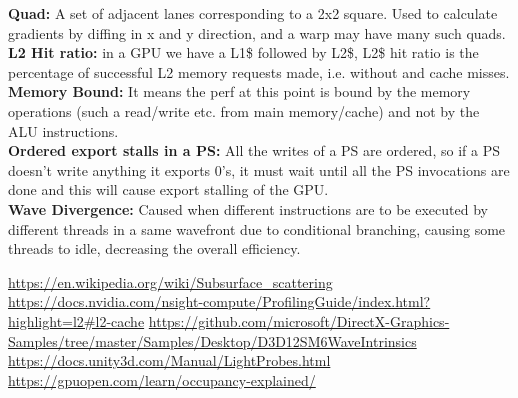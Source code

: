 \documentclass[14pt]{article}
\begin{document}
\textbf{Quad:} A set of adjacent lanes corresponding to a 2x2 square. Used to calculate gradients by diffing in x and y direction, and a warp may have many such quads. \\

\textbf{L2 Hit ratio:} in a GPU we have a L1\$ followed by L2\$, \cite{l2} L2\$ hit ratio is the percentage of successful L2 memory requests made, i.e. without and cache misses. \\

\textbf{Memory Bound:} It means the perf at this point is bound by the memory operations (such a read/write etc. from main memory/cache) and not by the ALU instructions. \\

\textbf{Ordered export stalls in a PS:} All the writes of a PS are ordered, so if a PS doesn't write anything it exports 0's, it must wait until all the PS invocations are done and this will cause export stalling of the GPU. \\

\textbf{Wave Divergence:} Caused when different instructions are to be executed by different threads in a same wavefront due to conditional branching, causing some threads to idle, decreasing the overall efficiency.


\begin{thebibliography}{2}

	 \url{https://en.wikipedia.org/wiki/Subsurface_scattering}
	 \url{https://docs.nvidia.com/nsight-compute/ProfilingGuide/index.html?highlight=l2#l2-cache}
	 \url{https://github.com/microsoft/DirectX-Graphics-Samples/tree/master/Samples/Desktop/D3D12SM6WaveIntrinsics}
	 \url{https://docs.unity3d.com/Manual/LightProbes.html}
	 \url{https://gpuopen.com/learn/occupancy-explained/}

\end{thebibliography}

\end{document}
